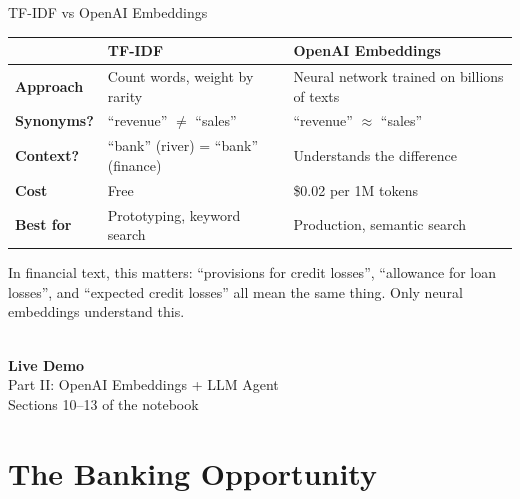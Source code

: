 \documentclass[aspectratio=169,12pt]{beamer}
\begin{document}
\begin{frame}[shrink=10]{TF-IDF vs OpenAI Embeddings}
  \begin{center}
    \renewcommand{\arraystretch}{1.4}
    \begin{tabular}{l >{\raggedright\arraybackslash}p{4cm} >{\raggedright\arraybackslash}p{4cm}}
      \toprule
      & \textbf{TF-IDF} & \textbf{OpenAI Embeddings} \\
      \midrule
      \textbf{Approach} & Count words, weight by rarity & Neural network trained on billions of texts \\
      \textbf{Synonyms?} & ``revenue'' $\neq$ ``sales'' & ``revenue'' $\approx$ ``sales'' \\
      \textbf{Context?} & ``bank'' (river) = ``bank'' (finance) & Understands the difference \\
      \textbf{Cost} & Free & \$0.02 per 1M tokens \\
      \textbf{Best for} & Prototyping, keyword search & Production, semantic search \\
      \bottomrule
    \end{tabular}
  \end{center}

  \vspace{0.5cm}
  \small\color{gray}
  In financial text, this matters: ``provisions for credit losses'', ``allowance for loan losses'',
  and ``expected credit losses'' all mean the same thing. Only neural embeddings understand this.
\end{frame}

\begin{frame}[plain]
  \begin{center}
    \vspace{2cm}
    {\Huge\color{accent2}\faRocket}\\[1cm]
    {\LARGE\bfseries Live Demo}\\[0.5cm]
    {\large Part II: OpenAI Embeddings + LLM Agent}\\[0.3cm]
    {\normalsize\color{gray} Sections 10--13 of the notebook}
  \end{center}
\end{frame}

\section{The Banking Opportunity}
\end{document}
